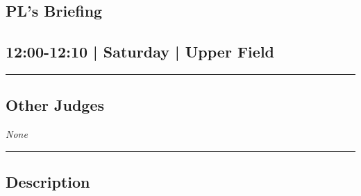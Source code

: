 \documentclass[10pt, A5]{article}
\begin{document}
		\begin{framed}
			\begin{minipage}{\textwidth}

			\setcounter{section}{23}
							\section{PL's Briefing}
						
			\subsection*{12:00-12:10 | Saturday | Upper Field}

			\vspace{0.25cm}
			\hrule
			\vspace{0.25cm}


			\subsection*{Other Judges}
						\textit{None}

					\vspace{0.25cm}
			\hrule
			\vspace{0.25cm}

			\begin{minipage}{\textwidth}
			\subsection*{\faListAlt \: Description}
			
			\end{minipage}


	\end{minipage}
	\end{framed}

	
\end{document}
